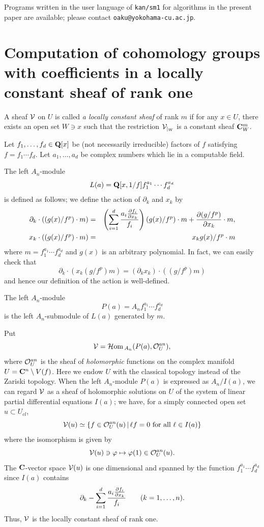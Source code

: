 \documentclass[12pt]{article}
\def\pd#1{ \partial_{#1} }
\def\C{{\bf C}}
\def\hol{ {\cal O} }
\def\Hom{ {\cal H}{\rm om}\, }
\def\Q{{\bf Q}}
\def\Vsc{ {\cal V} }
\begin{document}
Programs written in the user language of {\tt kan/sm1} for algorithms 
in the present paper are available; please contact 
{\tt oaku@yokohama-cu.ac.jp}.


\section{Computation of cohomology groups with coefficients in a locally
constant sheaf of rank one}

A sheaf $\Vsc$ on $U$ is called {\it a locally constant sheaf} of rank
$m$
if for any $x \in U$, there exists an open set $W \ni x$ such that
the restriction $\Vsc_{|_W}$ is a constant sheaf $\C_W^m$.

Let $f_1, \ldots, f_d \in \Q[x]$ be (not necessarily irreducible) factors of
$f$ satisfying $f = f_1 \cdots f_d$.
Let $a_1, \ldots, a_d$ be complex numbers which lie in a computable
field.

The left $A_n$-module 
$$L(a) = \Q[x,1/f] f_1^{a_1} \cdots f_d^{a_d} $$
is defined as follows;
we define the action of $\pd{k}$ and $x_k$ by 
\begin{eqnarray*}
 \pd{k} \cdot ((g(x)/f^p) \cdot m ) &=& \left( \sum_{i=1}^d
     { {a_i {{\partial f_i} \over {\partial x_k}}} \over
       {f_i}} \right) (g(x)/f^p)  \cdot m 
     + {{\partial (g/f^p)} \over {\partial x_k}} \cdot m, \\
 x_k \cdot ((g(x)/f^p) \cdot m) &=& x_k g(x)/f^p \cdot m \\
\end{eqnarray*}
where $m = f_1^{a_1} \cdots f_d^{a_d}$ and
$g(x)$ is an arbitrary polynomial.
In fact, we can easily check that
$$ \pd{k} \cdot ( x_k (g/f^p) m) = ( \pd{k} x_k ) \cdot ((g/f^p) m) $$
and hence our definition of the action is well-defined.

The left $A_n$-module 
$$ P(a) = A_n f_1^{a_1} \cdots f_d^{a_d} $$ is 
the left $A_n$-submodule of $L(a)$ generated by $m$.

Put 
$$ \Vsc = \Hom_{A_n} (P(a), \hol_U^{an}), $$
where $\hol_U^{an}$ is the sheaf of {\it holomorphic} functions on
the complex manifold $U = \C^n \setminus V(f)$.
Here we endow $U$ with the classical topology instead of the Zariski topology.
When the left $A_n$-module $P(a)$ is expressed as
$ A_n/I(a)$,  we can regard ${\cal V}$ as a sheaf of holomorphic solutions
on $U$ of the system of linear partial differential equations $I(a)$;
we have, for a simply connected  open set $u \subset U_{cl}$,
$$ {\cal V}(u) \simeq \{ f \in \hol_U^{an}(u) \,|\,  \ell f = 0 \mbox{ for all }
  \ell \in I(a) \}
$$ 
where the isomorphism is given by
$$  {\cal V}(u) \ni \varphi \mapsto \varphi(1) \in \hol_U^{an}(u). $$
The $\C$-vector space ${\cal V}(u)$ is one dimensional and 
spanned by the function
$ f_1^{a_1} \cdots f_d^{a_d} $
since $I(a)$ contains
$$
\pd{k} - \sum_{i=1}^d{ {a_i {{\partial f_i} \over {\partial x_k}}} \over
       {f_i}}
\qquad (k = 1,\dots,n).
$$
Thus, ${\cal V}$ is the locally constant sheaf of rank one.
\end{document}
